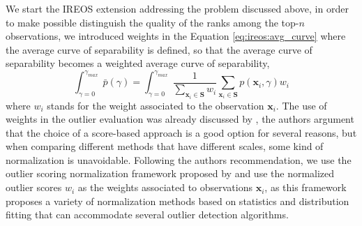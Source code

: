 We start the IREOS extension addressing the problem discussed above, in order to make possible distinguish the quality of the ranks among the top-$n$ observations, we introduced weights in the Equation \ref{eq:ireos:avg_curve} where the average curve of separability is defined, so that the average curve of separability becomes a weighted average curve of separability,
\begin{equation}
\int_{\gamma = 0}^{\gamma_{max}} \bar{p}(\gamma) = \int_{\gamma = 0}^{\gamma_{max}} \frac{1}{\sum_{\mathbf{x}_i \in \mathbf{S}} w_i} \sum_{\mathbf{x}_i \in \mathbf{S}} p(\mathbf{x}_i, \gamma) w_i
\label{eq:w_avg_sep}
\end{equation}
where $w_i$ stands for the weight associated to the observation $\mathbf{x}_i$. The use of weights in the outlier evaluation was already discussed by \cite{schubert2012}, the authors argument that the choice of a score-based approach is a good option for several reasons, but when comparing different methods that have different scales, some kind of normalization is unavoidable. Following the authors recommendation, we use the outlier scoring normalization framework proposed by \cite{kriegel2011} and use the normalized outlier scores $w_i$ as the weights associated to observations $\mathbf{x}_i$, as this framework proposes a variety of normalization methods based on statistics and distribution fitting that can accommodate several outlier detection algorithms.

